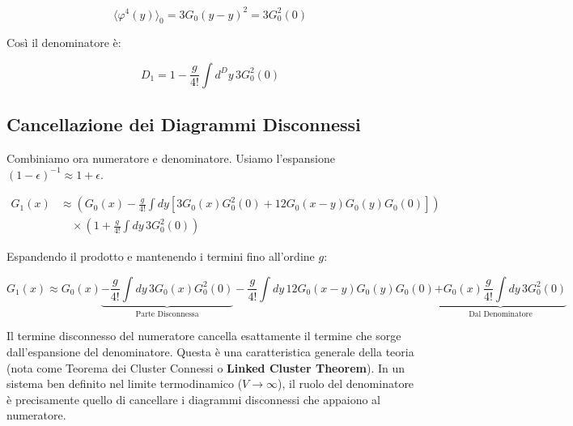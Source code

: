 \begin{equation}
    \langle \varphi^4(y) \rangle_0 = 3 G_0(y-y)^2 = 3 G_0^2(0)
\end{equation}

Così il denominatore è:

\begin{equation}
    D_1 = 1 - \frac{g}{4!} \int d^D y \, 3 G_0^2(0)
\end{equation}

\subsection{Cancellazione dei Diagrammi Disconnessi}
Combiniamo ora numeratore e denominatore.
Usiamo l'espansione $(1-\epsilon)^{-1} \approx 1 + \epsilon$.

\begin{align}
    G_1(x) &\approx \left( G_0(x) - \frac{g}{4!} \int dy [3 G_0(x)G_0^2(0) + 12 G_0(x-y)G_0(y)G_0(0)] \right) \nonumber \\
    &\quad \times \left( 1 + \frac{g}{4!} \int dy \, 3 G_0^2(0) \right)
\end{align}

Espandendo il prodotto e mantenendo i termini fino all'ordine $g$:

\begin{equation}
    G_1(x) \approx G_0(x) \underbrace{- \frac{g}{4!} \int dy \, 3 G_0(x) G_0^2(0)}_{\text{Parte Disconnessa}} - \frac{g}{4!} \int dy \, 12 G_0(x-y)G_0(y)G_0(0) \underbrace{+ G_0(x) \frac{g}{4!} \int dy \, 3 G_0^2(0)}_{\text{Dal Denominatore}}
\end{equation}

Il termine disconnesso del numeratore cancella esattamente il termine che sorge dall'espansione del denominatore.
Questa è una caratteristica generale della teoria (nota come Teorema dei Cluster Connessi o \textbf{Linked Cluster Theorem}).
In un sistema ben definito nel limite termodinamico ($V \to \infty$), il ruolo del denominatore è precisamente quello di cancellare i diagrammi disconnessi che appaiono al numeratore.


